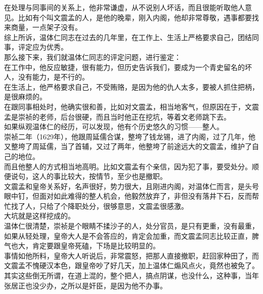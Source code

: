 \begin{multicols}{\theparacolNo}
在处理与同事间的关系上，他非常谦虚，从不说别人坏话，而且很能听取他人意见。比如有个叫文震孟的人，是他的晚辈，刚入内阁，他却非常尊敬，遇事都要找来商量，一点架子没有。\\

综上所诉，温体仁同志在过去的几年里，在工作上、生活上严格要求自己，团结同事，评定应为优秀。\\

那么接下来，我们就温体仁同志的评定问题，进行鉴定：\\

在工作中，他反应敏捷，很有能力，但历史告诉我们，要成为一个青史留名的坏人，没有能力，是不行的。\\

在生活上，他严格要求自己，不受贿赂，是因为他的仇人太多，要被人抓住把柄，是很麻烦的。\\

在跟同事相处时，他确实很和善，比如对文震孟，相当地客气，但原因在于，文震孟是崇祯的老师，后台很硬，而且当时他正在挖坑，等着文老师跳下去。\\

如果纵观温体仁的经历，可以发现，他有个历史悠久的习惯——整人。\\

崇祯二年（1629年），他跟周延儒合谋，整垮了钱龙锡，进了内阁，过了几年，他又整垮了周延儒，当了首辅，又过了两年，他整垮了前途远大的文震孟，维护了自己的地位。\\

而且他整人的方式相当地高明。比如文震孟有个亲信，因为犯了事，要受处分。顺便说句，这人的事比较大，按情节，至少也是撤职。\\

文震孟和皇帝关系好，名声很好，势力很大，且刚进内阁，对温体仁而言，是头号眼中钉，但面对如此难得的整人机会，他毅然放弃了，非但没有落井下石，反而帮忙找了人，只给了个降职处分，很够意思，文震孟很感激。\\

大坑就是这样挖成的。\\

温体仁很清楚，崇祯是个眼睛不揉沙子的人，处分官员，是只有更重，没有最重，如果从轻处理，皇帝大人是不会答应的，肯定会加重，而文震孟同志比较正直，脾气也大，肯定要跟皇帝死磕，下场是比较明显的。\\

事情如他所料，皇帝大人听说后，非常震怒，把那人直接撤职，赶回家种田了，而文震孟不愧硬汉本色，跟皇帝吵了好几天，加上温体仁煽风点火，竟然也被免了。\\

其实这些倒无所谓，在道上混的，整个把人，搞点阴谋，也没什么，这种事，当年张居正也没少办，之所以是奸臣，是因为他不办事。\\


\end{multicols}
